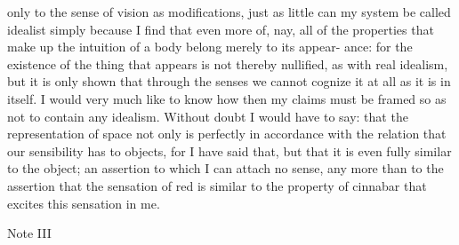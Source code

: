 only to the sense of vision as modiﬁcations, just as little can my system
be called idealist simply because I ﬁnd that even more of, nay, all of the
properties that make up the intuition of a body belong merely to its appear-
ance: for the existence of the thing that appears is not thereby nulliﬁed,
as with real idealism, but it is only shown that through the senses we
cannot cognize it at all as it is in itself.
I would very much like to know how then my claims must be framed
so as not to contain any idealism. Without doubt I would have to say: that
the representation of space not only is perfectly in accordance with the
relation that our sensibility has to objects, for I have said that, but that it
is even fully similar to the object; an assertion to which I can attach no
sense, any more than to the assertion that the sensation of red is similar
to the property of cinnabar that excites this sensation in me.

Note III

